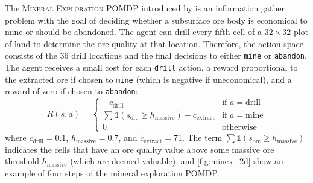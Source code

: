 The \textsc{Mineral Exploration} POMDP introduced by \citeauthor{mern2023intelligent} is an information gather problem with the goal of deciding whether a subsurface ore body is economical to mine or should be abandoned.
The agent can drill every fifth cell of a $32 \times 32$ plot of land to determine the ore quality at that location.
Therefore, the action space consists of the $36$ drill locations and the final decisions to either \texttt{mine} or \texttt{abandon}.
The agent receives a small cost for each \texttt{drill} action, a reward proportional to the extracted ore if chosen to \texttt{mine} (which is negative if uneconomical), and a reward of zero if chosen to \texttt{abandon}:
\begin{equation*}
R(s,a) = \begin{cases}
    -c_\text{drill} & \text{if } a=\text{drill}\\
    \sum\mathds{1}(s_\text{ore} \ge h_\text{massive}) - c_\text{extract} & \text{if } a=\text{mine}\\
    0 & \text{otherwise}
\end{cases}\label{eq:minex_reward}
\end{equation*}
where $c_\text{drill}=0.1$, $h_\text{massive}=0.7$, and $c_\text{extract}=71$.
The term $\sum\mathds{1}(s_\text{ore} \ge h_\text{massive})$ indicates the cells that have an ore quality value above some massive ore threshold $h_\text{massive}$ (which are deemed valuable).
 and \cref{fig:minex_2d} show an example of four steps of the mineral exploration POMDP.


